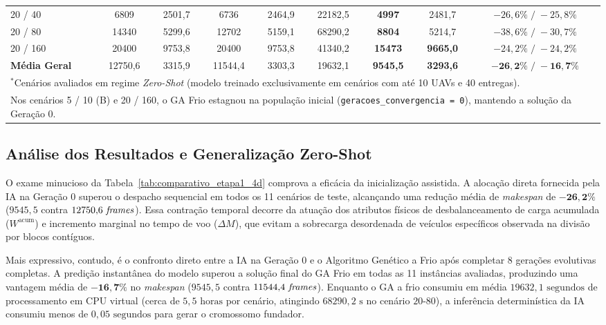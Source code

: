 \begin{table}[htbp]
{\begin{tabular}{lcccccccc}
20 / 40     & 6809  & 2501{,}7 & 6736  & 2464{,}9 & 22182{,}5 & \textbf{4997}  & 2481{,}7          & $-26{,}6\% \;/\; -25{,}8\%$ \\
20 / 80     & 14340 & 5299{,}6 & 12702 & 5159{,}1 & 68290{,}2 & \textbf{8804}  & 5214{,}7          & $-38{,}6\% \;/\; -30{,}7\%$ \\
20 / 160    & 20400 & 9753{,}8 & 20400 & 9753{,}8 & 41340{,}2 & \textbf{15473} & \textbf{9665{,}0} & $-24{,}2\% \;/\; -24{,}2\%$ \\
\midrule
\textbf{Média Geral} & 12750{,}6 & 3315{,}9 & 11544{,}4 & 3303{,}3 & 19632{,}1 & \textbf{9545{,}5} & \textbf{3293{,}6} & $\mathbf{-26{,}2\% \;/\; -16{,}7\%}$ \\
\bottomrule
\multicolumn{9}{l}{\footnotesize $^*$Cenários avaliados em regime \textit{Zero-Shot} (modelo treinado exclusivamente em cenários com até 10 UAVs e 40 entregas).} \\
\multicolumn{9}{l}{\footnotesize Nos cenários 5 / 10 (B) e 20 / 160, o GA Frio estagnou na população inicial (\texttt{geracoes\_convergencia = 0}), mantendo a solução da Geração 0.}
\end{tabular}%
}
\end{table}

\subsection*{Análise dos Resultados e Generalização Zero-Shot}

O exame minucioso da Tabela~\ref{tab:comparativo_etapa1_4d} comprova a eficácia da inicialização assistida. A alocação direta fornecida pela IA na Geração 0 superou o despacho sequencial em todos os 11 cenários de teste, alcançando uma redução média de \textit{makespan} de $\mathbf{-26{,}2\%}$ ($9545{,}5$ contra $12750{,}6\text{ \textit{frames}}$). Essa contração temporal decorre da atuação dos atributos físicos de desbalanceamento de carga acumulada ($W^{\text{acum}}$) e incremento marginal no tempo de voo ($\Delta M$), que evitam a sobrecarga desordenada de veículos específicos observada na divisão por blocos contíguos.

Mais expressivo, contudo, é o confronto direto entre a IA na Geração 0 e o Algoritmo Genético a Frio após completar 8 gerações evolutivas completas. A predição instantânea do modelo superou a solução final do GA Frio em todas as 11 instâncias avaliadas, produzindo uma vantagem média de $\mathbf{-16{,}7\%}$ no \textit{makespan} ($9545{,}5$ contra $11544{,}4\text{ \textit{frames}}$). Enquanto o GA a frio consumiu em média $19632{,}1\text{ segundos}$ de processamento em CPU virtual (cerca de $5{,}5\text{ horas}$ por cenário, atingindo $68290{,}2\text{ s}$ no cenário $20\text{-}80$), a inferência determinística da IA consumiu menos de $0{,}05\text{ segundos}$ para gerar o cromossomo fundador.

